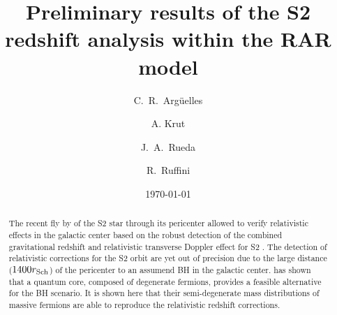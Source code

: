 \documentclass[nofootinbib,tightenlines,nobibnotes,aps,prl,preprint,superscriptaddress]{revtex4-1}
\begin{document}
\title{Preliminary results of the S2 redshift analysis within the RAR model}

\author{C.~R.~Argüelles}

\author{A. Krut}

\author{J.~A.~Rueda}

\author{R.~Ruffini}

\date{\today}


\begin{abstract}
The recent fly by of the S2 star through its pericenter allowed to verify relativistic effects in the galactic center based on the robust detection of the combined gravitational redshift and relativistic transverse Doppler effect for S2 \citep{2018A&A...615L..15G}. The detection of relativistic corrections for the S2 orbit are yet out of precision due to the large distance ($1400r_{\rm Sch}$) of the pericenter to an assumend BH in the galactic center. \citet{arguelles_novel_2018} has shown that a quantum core, composed of degenerate fermions, provides a feasible alternative for the BH scenario. It is shown here that their semi-degenerate mass distributions of massive fermions are able to reproduce the relativistic redshift corrections.
\end{abstract}
\end{document}
